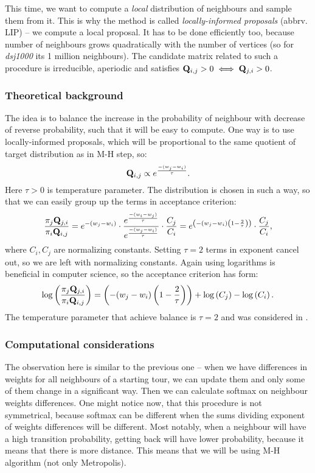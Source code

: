 	This time, we want to compute a \textit{local} distribution of neighbours and sample them from it. This is why the method is called \textit{locally-informed proposals} (abbrv. LIP) -- we compute a local proposal. It has to be done efficiently too, because number of neighbours grows quadratically with the number of vertices (so for \textit{dsj1000} its 1 million neighbours). The candidate matrix related to such a procedure is irreducible, aperiodic and satisfies $\mathbf{Q}_{i,j} >0 \iff \mathbf{Q}_{j,i} > 0$.
	
	\subsubsection{Theoretical background}
		The idea is to balance the increase in the probability of neighbour with decrease of reverse probability, such that it will be easy to compute. One way is to use locally-informed proposals, which will be proportional to the same quotient of target distribution as in M-H step, so:
		\begin{equation*}
			\mathbf{Q}_{i,j} \propto e^\frac{-(w_{j} - w_i)}{\tau}.
		\end{equation*}
		Here $\tau>0$ is temperature parameter. The distribution is chosen in such a way, so that we can easily group up the terms in acceptance criterion:
		\begin{equation*}
			\frac{\pi_j \mathbf{Q}_{j,i}}{\pi_i \mathbf{Q}_{i,j}} = e^{-(w_j-w_i)} \cdot \frac{e^\frac{-(w_{i} - w_j)}{\tau}}{e^\frac{-(w_{j} - w_i)}{\tau}} \cdot \frac{C_j}{C_i} = e^{\left( -(w_j-w_i) \left(1 - \frac{2}{\tau}\right) \right)} \cdot \frac{C_j}{C_i},
		\end{equation*}
		where $C_i, C_j$ are normalizing constants. Setting $\tau=2$ terms in exponent cancel out, so we are left with normalizing constants. Again using logarithms is beneficial in computer science, so the acceptance criterion has form:
		\begin{equation*}
			\log\left(\frac{\pi_j \mathbf{Q}_{j,i}}{\pi_i \mathbf{Q}_{i,j}}\right) = \left( -(w_j-w_i) \left(1 - \frac{2}{\tau}\right) \right) + \log\left(C_j\right) - \log\left(C_i\right).
		\end{equation*}
		The temperature parameter that achieve balance is $\tau=2$ and was considered in \cite{zanella2020informed}.
	
	\subsubsection{Computational considerations}
		The observation here is similar to the previous one -- when we have differences in weights for all neighbours of a starting tour, we can update them and only some of them change in a significant way. Then we can calculate softmax on neighbour weights differences. One might notice now, that this procedure is not symmetrical, because softmax can be different when the sums dividing exponent of weights differences will be different. Most notably, when a neighbour will have a high transition probability, getting back will have lower probability, because it means that there is more distance. This means that we will be using M-H algorithm (not only Metropolis).
		
